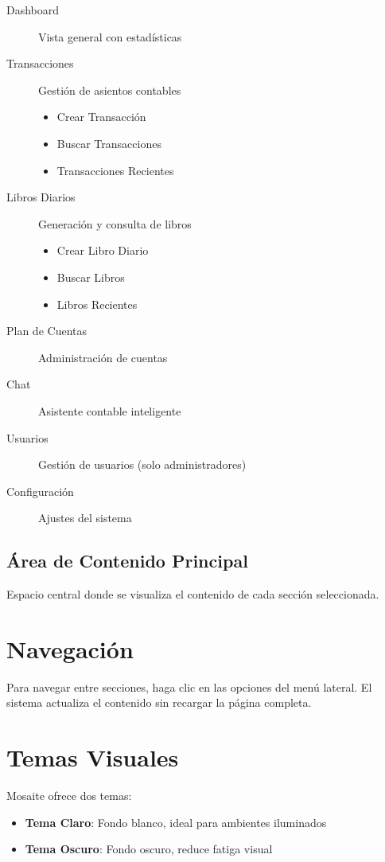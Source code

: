 \begin{description}
    \item[Dashboard] Vista general con estadísticas
    \item[Transacciones] Gestión de asientos contables
        \begin{itemize}
            \item Crear Transacción
            \item Buscar Transacciones
            \item Transacciones Recientes
        \end{itemize}
    \item[Libros Diarios] Generación y consulta de libros
        \begin{itemize}
            \item Crear Libro Diario
            \item Buscar Libros
            \item Libros Recientes
        \end{itemize}
    \item[Plan de Cuentas] Administración de cuentas
    \item[Chat] Asistente contable inteligente
    \item[Usuarios] Gestión de usuarios (solo administradores)
    \item[Configuración] Ajustes del sistema
\end{description}

\subsection{Área de Contenido Principal}

Espacio central donde se visualiza el contenido de cada sección seleccionada.

\section{Navegación}

Para navegar entre secciones, haga clic en las opciones del menú lateral. El sistema actualiza el contenido sin recargar la página completa.

\section{Temas Visuales}

Mosaite ofrece dos temas:

\begin{itemize}
    \item \textbf{Tema Claro}: Fondo blanco, ideal para ambientes iluminados
    \item \textbf{Tema Oscuro}: Fondo oscuro, reduce fatiga visual
\end{itemize}

